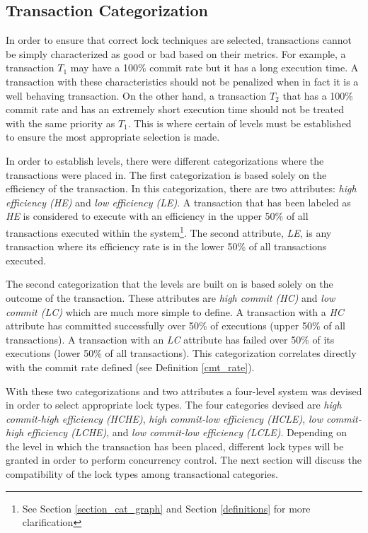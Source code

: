 \subsection{Transaction Categorization}
In order to ensure that correct lock techniques are selected, transactions cannot be simply characterized as good or bad based on their metrics. For example, a transaction $T_{1}$ may have a 100\% commit rate but it has a long execution time. A transaction with these characteristics should not be penalized when in fact it is a well behaving transaction. On the other hand, a transaction $T_{2}$ that has a 100\% commit rate and has an extremely short execution time should not be treated with the same priority as $T_{1}$. This is where certain of levels must be established to ensure the most appropriate selection is made.

In order to establish levels, there were different categorizations where the transactions were placed in. The first categorization is based solely on the efficiency of the transaction. In this categorization, there are two attributes: \textit{high efficiency (HE)} and \textit{low efficiency (LE)}. A transaction that has been labeled as \textit{HE} is considered to execute with an efficiency in the upper 50\% of all transactions executed within the system\footnote{See Section \ref{section_cat_graph} and Section \ref{definitions} for more clarification}. The second attribute, \textit{LE}, is any transaction where its efficiency rate is in the lower 50\% of all transactions executed.

The second categorization that the levels are built on is based solely on the outcome of the transaction. These attributes are \textit{high commit (HC)} and \textit{low commit (LC)} which are much more simple to define. A transaction with a \textit{HC} attribute has committed successfully over 50\% of executions (upper 50\% of all transactions). A transaction with an \textit{LC} attribute has failed over 50\% of its executions (lower 50\% of all transactions). This categorization correlates directly with the commit rate defined (see Definition \ref{cmt_rate}).

With these two categorizations and two attributes a four-level system was devised in order to select appropriate lock types. The four categories devised are \textit{high commit-high efficiency (HCHE)}, \textit{high commit-low efficiency (HCLE)}, \textit{low commit-high efficiency (LCHE)}, and \textit{low commit-low efficiency (LCLE)}. Depending on the level in which the transaction has been placed, different lock types will be granted in order to perform concurrency control. The next section will discuss the compatibility of the lock types among transactional categories.